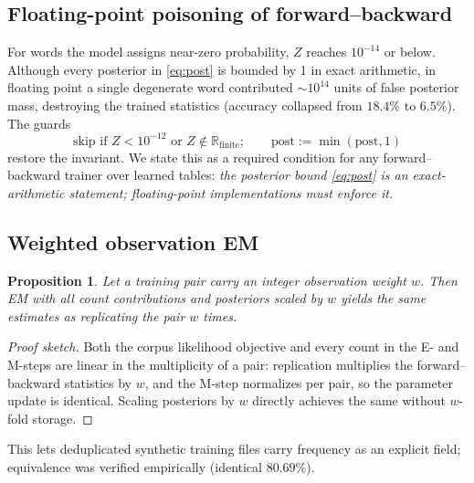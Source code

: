 \documentclass[11pt,a4paper]{article}
\newtheorem{proposition}{Proposition}
\begin{document}
\subsection{Floating-point poisoning of forward--backward}\label{sec:fp}
For words the model assigns near-zero probability, $Z$ reaches $10^{-14}$
or below. Although every posterior in \eqref{eq:post} is bounded by 1 in
exact arithmetic, in floating point a single degenerate word contributed
$\sim\!10^{14}$ units of false posterior mass, destroying the trained
statistics (accuracy collapsed from $18.4\%$ to $6.5\%$). The guards
\[
\text{skip if } Z < 10^{-12} \text{ or } Z \notin \mathbb{R}_{\mathrm{finite}};
\qquad \mathrm{post} := \min(\mathrm{post}, 1)
\]
restore the invariant. We state this as a required condition for any
forward--backward trainer over learned tables: \emph{the posterior bound
\eqref{eq:post} is an exact-arithmetic statement; floating-point
implementations must enforce it.}

\subsection{Weighted observation EM}
\begin{proposition}\label{prop:weighted}
Let a training pair carry an integer observation weight $w$. Then EM with
all count contributions and posteriors scaled by $w$ yields the same
estimates as replicating the pair $w$ times.
\end{proposition}
\begin{proof}[Proof sketch]
Both the corpus likelihood objective and every count in the E- and M-steps
are linear in the multiplicity of a pair: replication multiplies the
forward--backward statistics by $w$, and the M-step normalizes per pair, so
the parameter update is identical. Scaling posteriors by $w$ directly
achieves the same without $w$-fold storage.
\end{proof}
This lets deduplicated synthetic training files carry frequency as an
explicit field; equivalence was verified empirically (identical $80.69\%$).
\end{document}
